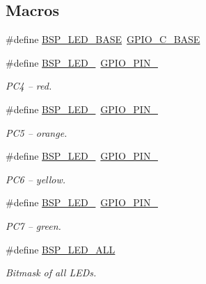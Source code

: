 \subsection*{Macros}
\begin{DoxyCompactItemize}
\item 
\#define \hyperlink{_open_mote-_c_c2538_2leds_8c_ac0949598ab8ed4fcb4210e1d70edfeb4}{B\+S\+P\+\_\+\+L\+E\+D\+\_\+\+B\+A\+SE}~\hyperlink{hw__memmap_8h_a35eb93c001f3b576606bb177393085ea}{G\+P\+I\+O\+\_\+\+C\+\_\+\+B\+A\+SE}
\item 
\#define \hyperlink{_open_mote-_c_c2538_2leds_8c_ac735bbacfdc0829d717c2968d355e016}{B\+S\+P\+\_\+\+L\+E\+D\+\_}~\hyperlink{_open_mote-_c_c2538_2source_2gpio_8h_ab3871e35868deecd260e586ad70d4b83}{G\+P\+I\+O\+\_\+\+P\+I\+N\+\_}
\begin{DoxyCompactList}\small\item\em P\+C4 -- red. \end{DoxyCompactList}\item 
\#define \hyperlink{_open_mote-_c_c2538_2leds_8c_a26beeb1f68fa093ec6bee8564c936305}{B\+S\+P\+\_\+\+L\+E\+D\+\_}~\hyperlink{_open_mote-_c_c2538_2source_2gpio_8h_a01cc9ed93f6fd12fd3403362779aaa18}{G\+P\+I\+O\+\_\+\+P\+I\+N\+\_}
\begin{DoxyCompactList}\small\item\em P\+C5 -- orange. \end{DoxyCompactList}\item 
\#define \hyperlink{_open_mote-_c_c2538_2leds_8c_a40f785df9050d95d4a977addebaca2ff}{B\+S\+P\+\_\+\+L\+E\+D\+\_}~\hyperlink{_open_mote-_c_c2538_2source_2gpio_8h_a9089f18f20ec88ee38ce6f27389e6d7e}{G\+P\+I\+O\+\_\+\+P\+I\+N\+\_}
\begin{DoxyCompactList}\small\item\em P\+C6 -- yellow. \end{DoxyCompactList}\item 
\#define \hyperlink{_open_mote-_c_c2538_2leds_8c_a552993626b0949cbdd6269520f8c3842}{B\+S\+P\+\_\+\+L\+E\+D\+\_}~\hyperlink{_open_mote-_c_c2538_2source_2gpio_8h_a482cb86c2f036e630661a41e8986bcfe}{G\+P\+I\+O\+\_\+\+P\+I\+N\+\_}
\begin{DoxyCompactList}\small\item\em P\+C7 -- green. \end{DoxyCompactList}\item 
\#define \hyperlink{_open_mote-_c_c2538_2leds_8c_ac3a9220505503270dec2befe8b73846a}{B\+S\+P\+\_\+\+L\+E\+D\+\_\+\+A\+LL}
\begin{DoxyCompactList}\small\item\em Bitmask of all L\+E\+Ds. \end{DoxyCompactList}\end{DoxyCompactItemize}
